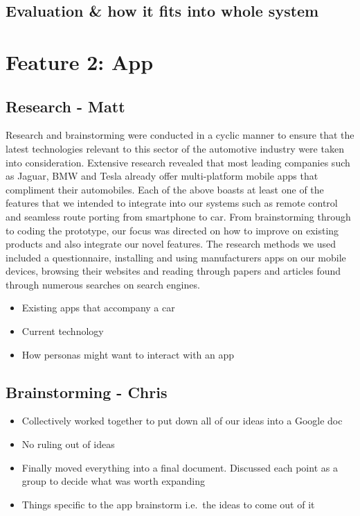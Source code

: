 \documentclass{article}
\begin{document}
\subsection{Evaluation \& how it fits into whole system}\label{ssec:nav-evaluation}




%
%
\section{Feature 2: App}\label{sec:app}

\subsection{Research - Matt}\label{ssec:app-research}
Research and brainstorming were conducted in a cyclic manner to ensure that the latest technologies relevant to this sector of the automotive industry were taken into consideration. Extensive research revealed that most leading companies such as Jaguar, BMW and Tesla already offer multi-platform mobile apps that compliment their automobiles. Each of the above boasts at least one of the features that we intended to integrate into our systems such as remote control and seamless route porting from smartphone to car. From brainstorming through to coding the prototype, our focus was directed on how to improve on existing products and also integrate our novel features.
The research methods we used included a questionnaire, installing and using manufacturers apps on our mobile devices, browsing their websites and reading through papers and articles found through numerous searches on search engines.
\begin{itemize}
  \item Existing apps that accompany a car
  \item Current technology
  \item How personas might want to interact with an app
\end{itemize}
\subsection{Brainstorming - Chris}\label{ssec:app-brainstorming}

\begin{itemize}
  \item Collectively worked together to put down all of our ideas into a Google doc
  \item No ruling out of ideas
  \item Finally moved everything into a final document. Discussed each point as a group to decide what was worth expanding
  \item Things specific to the app brainstorm i.e.\ the ideas to come out of it
\end{itemize}
\end{document}
